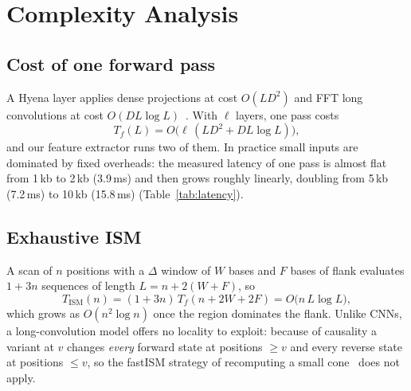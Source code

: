 \documentclass[conference]{IEEEtran}
\begin{document}
\section{Complexity Analysis}\label{sec:complexity}
\subsection{Cost of one forward pass}
A Hyena layer applies dense projections at cost $O(LD^2)$ and FFT long convolutions at cost $O(DL\log L)$~\cite{poli2023hyena,cooley1965fft}. With $\ell$ layers, one pass costs
\begin{equation}
T_f(L)=O\big(\ell\,(LD^2 + DL\log L)\big),
\end{equation}
and our feature extractor runs two of them. In practice small inputs are dominated by fixed overheads: the measured latency of one pass is almost flat from 1\,kb to 2\,kb (3.9\,ms) and then grows roughly linearly, doubling from 5\,kb (7.2\,ms) to 10\,kb (15.8\,ms) (Table~\ref{tab:latency}).

\subsection{Exhaustive ISM}
A scan of $n$ positions with a $\Delta$ window of $W$ bases and $F$ bases of flank evaluates $1+3n$ sequences of length $L=n+2(W+F)$, so
\begin{equation}
T_{\mathrm{ISM}}(n)=(1+3n)\,T_f(n+2W+2F)=O\big(n\,L\log L\big),
\end{equation}
which grows as $O(n^2\log n)$ once the region dominates the flank. Unlike CNNs, a long-convolution model offers no locality to exploit: because of causality a variant at $v$ changes \emph{every} forward state at positions $\ge v$ and every reverse state at positions $\le v$, so the fastISM strategy of recomputing a small cone~\cite{nair2022fastism} does not apply.
\end{document}
